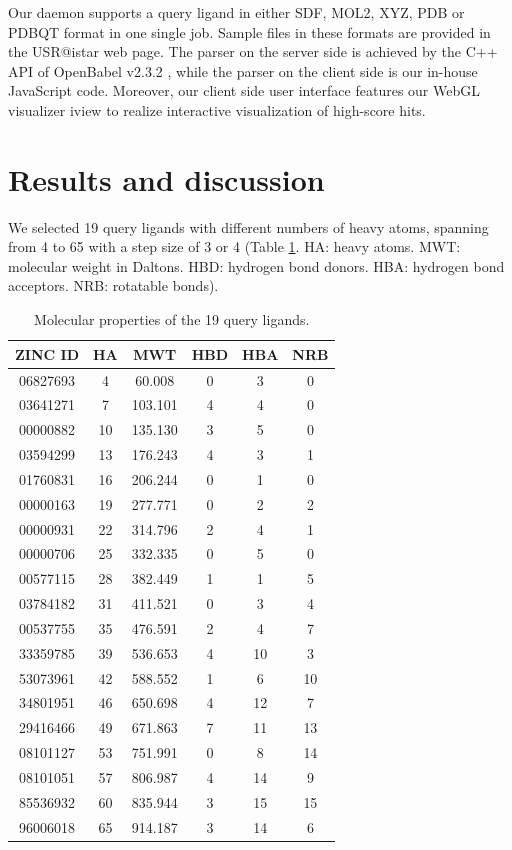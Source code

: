 Our daemon supports a query ligand in either SDF, MOL2, XYZ, PDB or PDBQT format in one single job. Sample files in these formats are provided in the USR@istar web page. The parser on the server side is achieved by the C++ API of OpenBabel v2.3.2 \citep{968}, while the parser on the client side is our in-house JavaScript code. Moreover, our client side user interface features our WebGL visualizer iview \citep{1366} to realize interactive visualization of high-score hits.

\section{Results and discussion}

We selected 19 query ligands with different numbers of heavy atoms, spanning from 4 to 65 with a step size of 3 or 4 (Table \ref{usr:Queries}. HA: heavy atoms. MWT: molecular weight in Daltons. HBD: hydrogen bond donors. HBA: hydrogen bond acceptors. NRB: rotatable bonds).

\begin{table}
\caption{Molecular properties of the 19 query ligands.}
\label{usr:Queries}
\begin{tabular}{cccccc}
\hline
ZINC ID  & HA & MWT & HBD & HBA & NRB\\
\hline
06827693 &  4 &  60.008 & 0 &  3 &  0\\
03641271 &  7 & 103.101 & 4 &  4 &  0\\
00000882 & 10 & 135.130 & 3 &  5 &  0\\
03594299 & 13 & 176.243 & 4 &  3 &  1\\
01760831 & 16 & 206.244 & 0 &  1 &  0\\
00000163 & 19 & 277.771 & 0 &  2 &  2\\
00000931 & 22 & 314.796 & 2 &  4 &  1\\
00000706 & 25 & 332.335 & 0 &  5 &  0\\
00577115 & 28 & 382.449 & 1 &  1 &  5\\
03784182 & 31 & 411.521 & 0 &  3 &  4\\
00537755 & 35 & 476.591 & 2 &  4 &  7\\
33359785 & 39 & 536.653 & 4 & 10 &  3\\
53073961 & 42 & 588.552 & 1 &  6 & 10\\
34801951 & 46 & 650.698 & 4 & 12 &  7\\
29416466 & 49 & 671.863 & 7 & 11 & 13\\
08101127 & 53 & 751.991 & 0 &  8 & 14\\
08101051 & 57 & 806.987 & 4 & 14 &  9\\
85536932 & 60 & 835.944 & 3 & 15 & 15\\
96006018 & 65 & 914.187 & 3 & 14 &  6\\
\hline
\end{tabular}
\end{table}

